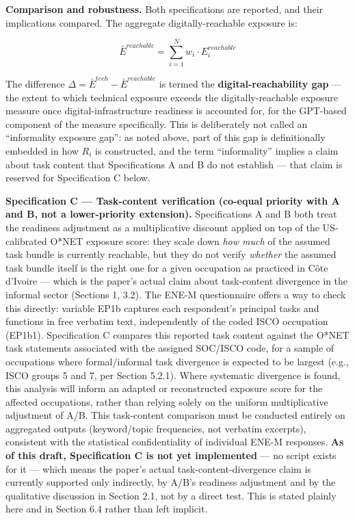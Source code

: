 \documentclass[
  11pt,
]{article}
\begin{document}
\textbf{Comparison and robustness.} Both specifications are reported,
and their implications compared. The aggregate digitally-reachable
exposure is:

\[\bar{E}^{reachable} = \sum_{i=1}^{N} w_i \cdot E_i^{reachable}\]

The difference \(\Delta = \bar{E}^{tech} - \bar{E}^{reachable}\) is
termed the \textbf{digital-reachability gap} --- the extent to which
technical exposure exceeds the digitally-reachable exposure measure once
digital-infrastructure readiness is accounted for, for the GPT-based
component of the measure specifically. This is deliberately not called
an ``informality exposure gap'': as noted above, part of this gap is
definitionally embedded in how \(R_i\) is constructed, and the term
``informality'' implies a claim about task content that Specifications A
and B do not establish --- that claim is reserved for Specification C
below.

\textbf{Specification C --- Task-content verification (co-equal priority
with A and B, not a lower-priority extension).} Specifications A and B
both treat the readiness adjustment as a multiplicative discount applied
on top of the US-calibrated O*NET exposure score: they scale down
\emph{how much} of the assumed task bundle is currently reachable, but
they do not verify \emph{whether} the assumed task bundle itself is the
right one for a given occupation as practiced in Côte d'Ivoire --- which
is the paper's actual claim about task-content divergence in the
informal sector (Sections 1, 3.2). The ENE-M questionnaire offers a way
to check this directly: variable EP1b captures each respondent's
principal tasks and functions in free verbatim text, independently of
the coded ISCO occupation (EP1b1). Specification C compares this
reported task content against the O*NET task statements associated with
the assigned SOC/ISCO code, for a sample of occupations where
formal/informal task divergence is expected to be largest (e.g., ISCO
groups 5 and 7, per Section 5.2.1). Where systematic divergence is
found, this analysis will inform an adapted or reconstructed exposure
score for the affected occupations, rather than relying solely on the
uniform multiplicative adjustment of A/B. This task-content comparison
must be conducted entirely on aggregated outputs (keyword/topic
frequencies, not verbatim excerpts), consistent with the statistical
confidentiality of individual ENE-M responses. \textbf{As of this draft,
Specification C is not yet implemented} --- no script exists for it ---
which means the paper's actual task-content-divergence claim is
currently supported only indirectly, by A/B's readiness adjustment and
by the qualitative discussion in Section 2.1, not by a direct test. This
is stated plainly here and in Section 6.4 rather than left implicit.
\end{document}
